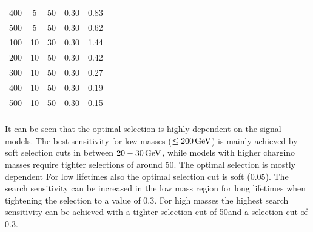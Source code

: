 \begin{table}[!h]
{\begin{tabular}{c |c| c| c| c}
400&                          5&                            50&                           0.30&                         0.83\\
500&                          5&                            50&                           0.30&                         0.62\\
100&                          10&                           30&                           0.30&                         1.44\\
200&                          10&                           50&                           0.30&                         0.42\\
300&                          10&                           50&                           0.30&                         0.27\\
400&                          10&                           50&                           0.30&                         0.19\\
500&                          10&                           50&                           0.30&                         0.15\\
\bottomrule
\multicolumn{5}{c}{} \\
\end{tabular}}
\end{table}

It can be seen that the optimal selection is highly dependent on the signal models.
The best sensitivity for low masses ($\leq 200\,\text{Ge}\kern-0.06667em\text{V}$) is mainly achieved by soft selection cuts in \pt between $20-30\,\text{Ge}\kern-0.06667em\text{V}$, while models with higher chargino masses require tighter \pt selections of around 50\gev.
The optimal \ias selection is mostly dependent 
For low lifetimes also the optimal \ias selection cut is soft ($0.05$).
The search sensitivity can be increased in the low mass region for long lifetimes when tightening the \ias selection to a value of 0.3.
For high masses the highest search sensitivity can be achieved with a tighter \pt selection cut of 50\gev and a \ias selection cut of 0.3.

